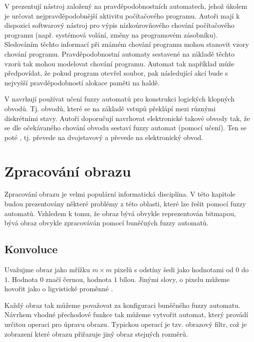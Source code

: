 V \cite{Maz+-ProTreAutAppBehMod} prezentují nástroj založený na pravděpodobnostních automatech, jehož úkolem je určovat nejpravděpodobnější aktivitu počítačového programu. Autoři mají k dispozici softwarový nástroj pro výpis nízkoúrovňového chování počítačového programu (např. systémová volání, změny na programovém zásobníku). Sledováním těchto informací při známém chování programu mohou stanovit vzory chování programu. Pravděpodobnostní automaty sestavené na základě těchto vzorů tak mohou modelovat chování programu. Automat tak například může předpovídat, že pokud program otevřel soubor, pak následující akcí bude s nejvyšší pravděpodobností alokace paměti na haldě.

V \cite{PedGac-LeaFuzzAut} navrhují používat učení fuzzy automatů pro konstrukci logických klopných obvodů. Tj. obvodů, které se na základě vstupů překlápí mezi různými diskrétními stavy. Autoři doporučují navrhovat elektronické takové obvody tak, že se dle očekávaného chování obvodu sestaví fuzzy automat (pomocí učení). Ten se poté , tj. převede na dvojstavový a převede na elektronický obvod.

\section{Zpracování obrazu} \label{cha:ImgProc}
Zpracování obrazu je velmi populární informatická disciplína. V této kapitole budou prezentovány některé problémy z této oblasti, které lze řešit pomocí fuzzy automatů. Vzhledem k tomu, že obraz bývá obvykle reprezentován bitmapou, bývá obraz obvykle zpracováván pomocí buněčných fuzzy automatů.

\subsection{Konvoluce} \label{subs:Convol}
Uvažujme obraz jako mřížku $m \times m$ pixelů s odstíny šedi jako hodnotami od $0$ do $1$. Hodnota $0$ značí černou, hodnota $1$ bílou. Jinými slovy, o pixelu můžeme hovořit jako o ligvistické proměnné .

Každý obraz tak můžeme považovat za konfiguraci buněčného fuzzy automatu. Návrhem vhodné přechodové funkce tak můžeme vytvořit automat, který provádí určitou operaci pro úpravu obrazu. Typickou operací je tzv. obrazový filtr, což je zobrazení které obrazu přiřazuje jiný obraz stejných rozměrů.


